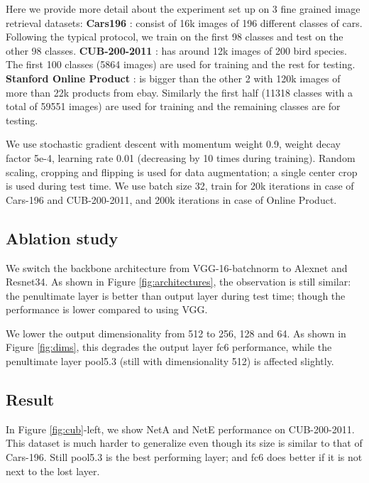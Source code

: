\documentclass[10pt,twocolumn,letterpaper]{article}
\begin{document}
Here we provide more detail about the experiment set up on 3 fine grained image retrieval datasets:
\textbf{Cars196} \cite{KrauseStarkDengFei-Fei_3DRR2013}: consist of 16k images of 196 different classes of cars. Following the typical protocol, we train on the first 98 classes and test on the other 98 classes.
\textbf{CUB-200-2011} \cite{WahCUB_200_2011}: has around 12k images of 200 bird species. The first 100 classes (5864 images) are used for training and the rest for testing.
\textbf{Stanford Online Product} \cite{song2016deep}: is bigger than the other 2 with 120k images of more than 22k products from ebay. Similarly the first half (11318 classes with a total of 59551 images) are used for training and the remaining classes are for testing.

We use stochastic gradient descent with momentum weight 0.9, weight decay factor 5e-4, learning rate 0.01 (decreasing by 10 times during training). Random scaling, cropping and flipping is used for data augmentation; a single center crop is used during test time. We use batch size 32, train for 20k iterations in case of Cars-196 and CUB-200-2011, and 200k iterations in case of Online Product.



\subsection{Ablation study}


We switch the backbone architecture from VGG-16-batchnorm to Alexnet and Resnet34. As shown in Figure \ref{fig:architectures}, the observation is still similar: the penultimate layer is better than output layer during test time; though the performance is lower compared to using VGG.

We lower the output dimensionality from 512 to 256, 128 and 64. As shown in Figure \ref{fig:dims}, this degrades the output layer fc6 performance, while the penultimate layer pool5.3 (still with dimensionality 512) is affected slightly.






\subsection{Result}

In Figure \ref{fig:cub}-left, we show NetA and NetE performance on CUB-200-2011. This dataset is much harder to generalize even though its size is similar to that of Cars-196. Still pool5.3 is the best performing layer; and fc6 does better if it is not next to the lost layer.
\end{document}
